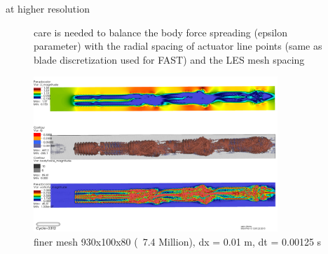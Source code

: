\documentclass[xcolor=x11names,compress]{beamer}
\begin{document}
	\begin{frame}{at higher resolution}

		\begin{figure}[p]
		    \centering
    		
    		\small care is needed to balance the body force spreading (epsilon parameter) with the 
    		radial spacing of actuator line points (same as blade discretization used for FAST)
    		and the LES mesh spacing

    		\includegraphics[width=0.82\textwidth]{figures/fastFlume__Turbines=3_TSR=6p2_Layout=offset_Mesh=fine_v0001.png}
		    \caption{\scriptsize{finer mesh 930x100x80 (~7.4 Million), dx = 0.01 m, dt = 0.00125 s}}

		\end{figure}

	\end{frame}
\end{document}
